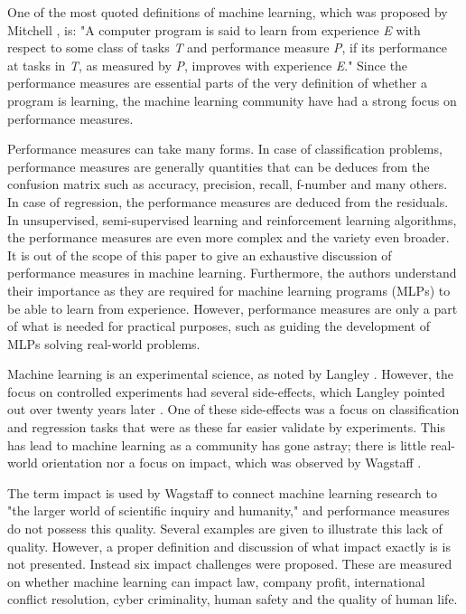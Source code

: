\documentclass{article}
\begin{document}
One of the most quoted definitions of machine learning, which was proposed by Mitchell \cite{Mitchell_1997}, is: "A computer program is said to learn from experience \emph{E} with respect to some class of tasks \emph{T} and performance measure \emph{P}, if its performance at tasks in \emph{T}, as measured by \emph{P}, improves with experience \emph{E}." 
Since the performance measures are essential parts of the very definition of whether a program is learning, the machine learning community have had a strong focus on performance measures. 

Performance measures can take many forms. 
In case of classification problems, performance measures are generally quantities that can be deduces from the confusion matrix such as accuracy, precision, recall, f-number and many others. 
In case of regression, the performance measures are deduced from the residuals. 
In unsupervised, semi-supervised learning and reinforcement learning algorithms, the performance measures are even more complex and the variety even broader. 
It is out of the scope of this paper to give an exhaustive discussion of performance measures in machine learning. 
Furthermore, the authors understand their importance as they are required for machine learning programs (MLPs) to be able to learn from experience. 
However, performance measures are only a part of what is needed for practical purposes, such as guiding the development of MLPs solving real-world problems.

Machine learning is an experimental science, as noted by Langley \cite{Langley_1988}.
However, the focus on controlled experiments had several side-effects, which Langley pointed out over twenty years later \cite{Langley_2011}.
One of these side-effects was a focus on classification and regression tasks that were as these far easier validate by experiments. 
This has lead to machine learning as a community has gone astray; there is little real-world orientation nor a focus on impact, which was observed by Wagstaff \cite{Wagstaff_2012}.

The term impact is used by Wagstaff to connect machine learning research to "the larger world of scientific inquiry and humanity," and performance measures do not possess this quality.
Several examples are given to illustrate this lack of quality.
However, a proper definition and discussion of what impact exactly is is not presented.
Instead six impact challenges were proposed.
These are measured on whether machine learning can impact law, company profit, international conflict resolution, cyber criminality, human safety and the quality of human life.
\end{document}

